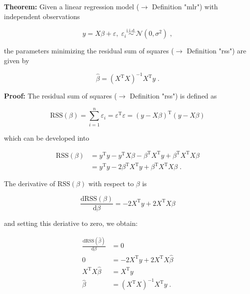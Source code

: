\documentclass[a4paper,12pt]{book}
\begin{document}
\vspace{1em}
\textbf{Theorem:} Given a linear regression model ($\rightarrow$ Definition "mlr") with independent observations

\begin{equation} \label{eq:mlr-ols2-MLR}
y = X\beta + \varepsilon, \; \varepsilon_i \overset{\mathrm{i.i.d.}}{\sim} \mathcal{N}(0, \sigma^2) \; ,
\end{equation}

the parameters minimizing the residual sum of squares ($\rightarrow$ Definition "rss") are given by

\begin{equation} \label{eq:mlr-ols2-OLS}
\hat{\beta} = (X^\mathrm{T} X)^{-1} X^\mathrm{T} y \; .
\end{equation}


\vspace{1em}
\textbf{Proof:} The residual sum of squares ($\rightarrow$ Definition "rss") is defined as

\begin{equation} \label{eq:mlr-ols2-RSS}
\mathrm{RSS}(\beta) = \sum_{i=1}^n \varepsilon_i = \varepsilon^\mathrm{T} \varepsilon = (y-X\beta)^\mathrm{T} (y-X\beta)
\end{equation}

which can be developed into

\begin{equation} \label{eq:mlr-ols2-RSS-dev}
\begin{split}
\mathrm{RSS}(\beta) &= y^\mathrm{T} y - y^\mathrm{T} X \beta - \beta^\mathrm{T} X^\mathrm{T} y + \beta^\mathrm{T} X^\mathrm{T} X \beta \\
&= y^\mathrm{T} y - 2 \beta^\mathrm{T} X^\mathrm{T} y + \beta^\mathrm{T} X^\mathrm{T} X \beta \; .
\end{split}
\end{equation}

The derivative of $\mathrm{RSS}(\beta)$ with respect to $\beta$ is

\begin{equation} \label{eq:mlr-ols2-RSS-der}
\frac{\mathrm{d}\mathrm{RSS}(\beta)}{\mathrm{d}\beta} = - 2 X^\mathrm{T} y + 2 X^\mathrm{T} X \beta
\end{equation}

and setting this deriative to zero, we obtain:

\begin{equation} \label{eq:mlr-ols2-OLS-qed}
\begin{split}
\frac{\mathrm{d}\mathrm{RSS}(\hat{\beta})}{\mathrm{d}\beta} &= 0 \\
0 &= - 2 X^\mathrm{T} y + 2 X^\mathrm{T} X \hat{\beta} \\
X^\mathrm{T} X \hat{\beta} &= X^\mathrm{T} y \\
\hat{\beta} &= (X^\mathrm{T} X)^{-1} X^\mathrm{T} y \; .
\end{split}
\end{equation}
\end{document}
